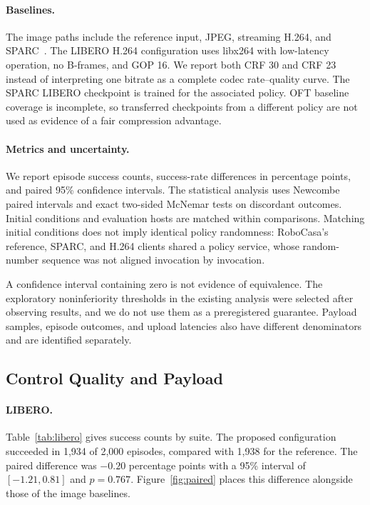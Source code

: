 \paragraph{Baselines.}
The image paths include the reference input, JPEG, streaming H.264, and
SPARC~\cite{sparc}. The LIBERO H.264 configuration uses libx264 with
low-latency operation, no B-frames, and GOP 16. We report both CRF 30 and
CRF 23 instead of interpreting one bitrate as a complete codec
rate--quality curve. The SPARC LIBERO checkpoint is trained for the
associated policy. OFT baseline coverage is incomplete, so transferred
checkpoints from a different policy are not used as evidence of a fair
compression advantage.

\paragraph{Metrics and uncertainty.}
We report episode success counts, success-rate differences in percentage
points, and paired 95\% confidence intervals. The statistical
analysis uses Newcombe paired intervals and exact two-sided McNemar
tests on discordant outcomes. Initial conditions and evaluation hosts are
matched within comparisons. Matching initial conditions does not imply
identical policy randomness: RoboCasa's reference, SPARC, and H.264
clients shared a policy service, whose random-number sequence was not
aligned invocation by invocation.

A confidence interval containing zero is not evidence of equivalence.
The exploratory noninferiority thresholds in the existing analysis were
selected after observing results, and we do not use them as a
preregistered guarantee. Payload samples, episode outcomes, and upload
latencies also have different denominators and are identified separately.

\subsection{Control Quality and Payload}
\paragraph{LIBERO.}
Table~\ref{tab:libero} gives success counts by suite. The proposed
configuration succeeded in 1,934 of 2,000 episodes, compared with 1,938 for
the reference. The paired difference was $-0.20$ percentage points with a
95\% interval of $[-1.21,0.81]$ and $p=0.767$. Figure~\ref{fig:paired}
places this difference alongside those of the image baselines.

